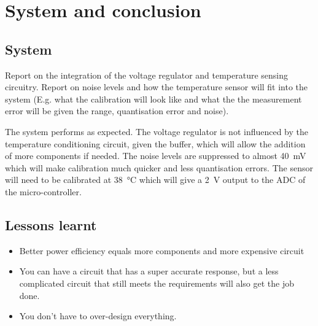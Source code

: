\chapter{System and conclusion}
\vspace{-5mm}
\section{System}
Report on the integration of the voltage regulator and temperature sensing circuitry. 
Report on noise levels and how the temperature sensor will fit into the system (E.g. what the calibration will look like and what the the measurement error will be given the range, quantisation error and noise). 

The system performs as expected. The voltage regulator is not influenced by the temperature conditioning circuit, given the buffer, which will allow the addition of more components if needed. The noise levels are suppressed to almost \SI{40}{\milli\volt} which will make calibration much quicker and less quantisation errors. The sensor will need to be calibrated at \SI{38}{\celsius} which will give a \SI{2}{\volt} output to the ADC of the micro-controller.

\section{Lessons learnt}
\begin{itemize}
    \item Better power efficiency equals more components and more expensive circuit 
    \item You can have a circuit that has a super accurate response, but a less complicated circuit that still meets the requirements will also get the job done.
    \item You don't have to over-design everything.
\end{itemize}
